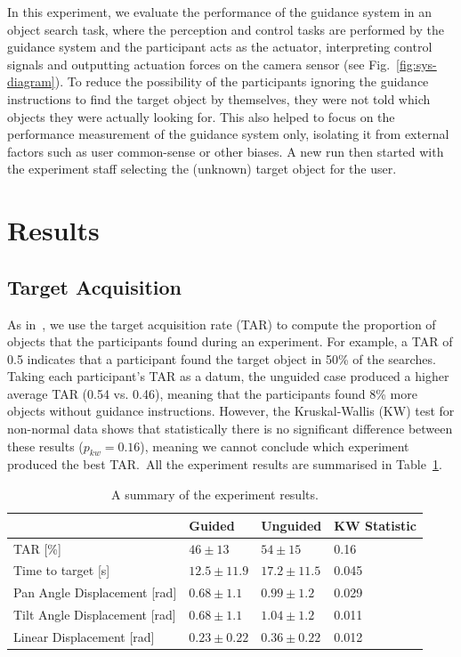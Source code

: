 \documentclass[runningheads]{llncs}
\begin{document}
In this experiment, we evaluate the performance of the guidance system in an object search task, where the perception and control tasks are performed by the guidance system and the participant acts as the actuator, interpreting control signals and outputting actuation forces on the camera sensor (see Fig.~\ref{fig:sys-diagram}). 
%
To reduce the possibility of the participants ignoring the guidance instructions to find the target object by themselves, they were not told which objects they were actually looking for.
This also helped to focus on the performance measurement of the guidance system only, isolating it from external factors such as user common-sense or other biases.
A new run then started with the experiment staff selecting the (unknown) target object for the user.

\section{Results}\label{sec:results}

\subsection{Target Acquisition}

As in~\cite{lock2019active}, we use the target acquisition rate (TAR) to compute the proportion of objects that the participants found during an experiment. 
For example, a TAR of 0.5 indicates that a participant found the target object in 50\% of the searches. 
Taking each participant's TAR as a datum, the unguided case produced a higher average TAR (0.54 vs. 0.46), meaning that the participants found 8\% more objects without guidance instructions.
However, the Kruskal-Wallis (KW) test for non-normal data shows that statistically there is no significant difference between these results ($p_{kw} = 0.16$), meaning we cannot conclude which experiment produced the best TAR.\
All the experiment results are summarised in Table~\ref{tab:results}. 

\begin{table}
  \centering
  \caption{A summary of the experiment results. }\label{tab:results}
  \begin{tabular}{p{5cm}p{2cm}p{2cm}p{2.5cm}}
    \toprule
    & \textbf{Guided}             & \textbf{Unguided} & \textbf{KW Statistic} \\\midrule
    TAR [\%]                      & $46\pm13$         & $54\pm15$     &  0.16 \\\midrule
    Time to target [s]            & $12.5\pm11.9$     & $17.2\pm11.5$ & 0.045 \\\midrule
    Pan Angle Displacement [rad]  & $0.68\pm1.1$      & $0.99\pm1.2$  & 0.029 \\\midrule
    Tilt Angle Displacement [rad] & $0.68\pm1.1$      & $1.04\pm1.2$  & 0.011 \\\midrule
    Linear Displacement [rad]     & $0.23\pm0.22$     & $0.36\pm0.22$ & 0.012 \\\midrule
    \bottomrule
  \end{tabular}
\end{table}
\end{document}
